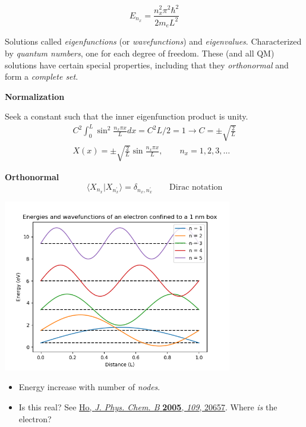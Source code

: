 \documentclass[11pt]{article}
\begin{document}
\begin{equation}
E_{n_x} = \frac{n_x^2\pi^2\hbar^2}{2 m_e L^2}
\end{equation}

Solutions called \emph{eigenfunctions} (or \emph{wavefunctions}) and \emph{eigenvalues}.  Characterized
by \emph{quantum numbers}, one for each degree of freedom.  These (and all QM) solutions have
certain special properties, including that they \emph{orthonormal} and form a \emph{complete set}.

\textbf{Normalization}

Seek a constant such that the inner eigenfunction product is unity.
\begin{eqnarray}
C^2 \int_0^L \sin^2 \frac{n_x\pi x}{L} dx = C^2 L/2 = 1 \rightarrow C=\pm\sqrt{\frac{2}{L}}\\
X(x) = \pm\sqrt{\frac{2}{L}}\sin\frac{n_x\pi x}{L},\qquad n_x = 1,2,3,\ldots
\end{eqnarray}

\textbf{Orthonormal}
\begin{equation}
\langle X_{n_x} | X_{n^\prime_x} \rangle = \delta_{n_{x},n_x^\prime}\qquad
\text{Dirac notation}
\end{equation}

\begin{center}
\includegraphics[width=0.75\textwidth]{./Images/1DPIAB.png}
\end{center}

\begin{itemize}
\item Energy increase with number of \emph{nodes}.

\item Is this real?  See \href{http://dx.doi.org/10.1021/jp053496l}{Ho, \emph{J. Phys. Chem. B} \textbf{2005}, \emph{109}, 20657}.  Where \emph{is} the electron?
\end{itemize}
\end{document}
